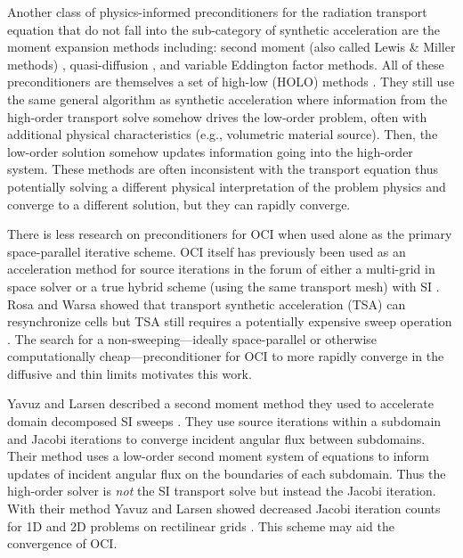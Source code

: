 Another class of physics-informed preconditioners for the radiation transport equation that do not fall into the sub-category of synthetic acceleration are the moment expansion methods including: second moment (also called Lewis \& Miller methods) \cite{olivier_2024_smoms, lewis_computational_1984, oliver_2025_secondmoment, oliver_phd}, quasi-diffusion \cite{ani_1986_quasidiffusion, goldin_1964_quasidissuion}, and variable Eddington factor \cite{lou_2021_vef, coale_2024_rmomvef} methods.
All of these preconditioners are themselves a set of high-low (HOLO) methods \cite{chacon_2017_holosurvey}.
They still use the same general algorithm as synthetic acceleration where information from the high-order transport solve somehow drives the low-order problem, often with additional physical characteristics (e.g., volumetric material source).
Then, the low-order solution somehow updates information going into the high-order system.
These methods are often inconsistent with the transport equation thus potentially solving a different physical interpretation of the problem physics and converge to a different solution, but they can rapidly converge.

There is less research on preconditioners for OCI when used alone as the primary space-parallel iterative scheme.
OCI itself has previously been used as an acceleration method for source iterations in the forum of either a multi-grid in space solver \cite{kang2000oci, man1994parallel} or a true hybrid scheme (using the same transport mesh) with SI \cite{hoagland_hybrid_2021}.
Rosa and Warsa showed that transport synthetic acceleration (TSA) can resynchronize cells but TSA still requires a potentially expensive sweep operation \cite{tsa2009rosa}.
The search for a non-sweeping---ideally space-parallel or otherwise computationally cheap---preconditioner for OCI to more rapidly converge in the diffusive and thin limits motivates this work.

Yavuz and Larsen described a second moment method they used to accelerate domain decomposed SI sweeps \cite{yavuz_spatial_1989, yavuz_phd}.
They use source iterations within a subdomain and Jacobi iterations to converge incident angular flux between subdomains.
Their method uses a low-order second moment system of equations to inform updates of incident angular flux on the boundaries of each subdomain.
Thus the high-order solver is \textit{not} the SI transport solve but instead the Jacobi iteration.
With their method Yavuz and Larsen showed decreased Jacobi iteration counts for 1D and 2D problems on rectilinear grids \cite{yavuz_spatial_1989, yavuz_1992_2ddd}.
This scheme may aid the convergence of OCI.

